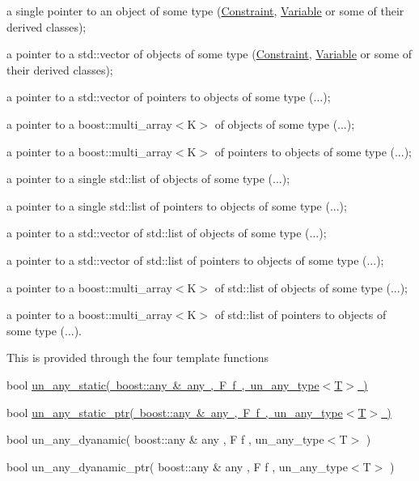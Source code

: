 \begin{DoxyItemize}
\item a single pointer to an object of some type (\mbox{\hyperlink{class_s_m_spp__di__unipi__it_1_1_constraint}{Constraint}}, \mbox{\hyperlink{class_s_m_spp__di__unipi__it_1_1_variable}{Variable}} or some of their derived classes);
\item a pointer to a std\+::vector of objects of some type (\mbox{\hyperlink{class_s_m_spp__di__unipi__it_1_1_constraint}{Constraint}}, \mbox{\hyperlink{class_s_m_spp__di__unipi__it_1_1_variable}{Variable}} or some of their derived classes);
\item a pointer to a std\+::vector of pointers to objects of some type (...);
\item a pointer to a boost\+::multi\+\_\+array$<$\+K$>$ of objects of some type (...);
\item a pointer to a boost\+::multi\+\_\+array$<$\+K$>$ of pointers to objects of some type (...);
\item a pointer to a single std\+::list of objects of some type (...);
\item a pointer to a single std\+::list of pointers to objects of some type (...);
\item a pointer to a std\+::vector of std\+::list of objects of some type (...);
\item a pointer to a std\+::vector of std\+::list of pointers to objects of some type (...);
\item a pointer to a boost\+::multi\+\_\+array$<$\+K$>$ of std\+::list of objects of some type (...);
\item a pointer to a boost\+::multi\+\_\+array$<$\+K$>$ of std\+::list of pointers to objects of some type (...).
\end{DoxyItemize}

This is provided through the four template functions

bool \mbox{\hyperlink{group__boost__any__stuff_ga8ec1a694aa7a5fa58ab801c1ea419fa8}{un\+\_\+any\+\_\+static( boost\+::any \& any , F f , un\+\_\+any\+\_\+type$<$\+T$>$ )}}

bool \mbox{\hyperlink{group__boost__any__stuff_ga52fc4cc92fd415dd9ba1ae8b68f44931}{un\+\_\+any\+\_\+static\+\_\+ptr( boost\+::any \& any , F f , un\+\_\+any\+\_\+type$<$\+T$>$ )}}

bool un\+\_\+any\+\_\+dyanamic( boost\+::any \& any , F f , un\+\_\+any\+\_\+type$<$\+T$>$ )

bool un\+\_\+any\+\_\+dyanamic\+\_\+ptr( boost\+::any \& any , F f , un\+\_\+any\+\_\+type$<$\+T$>$ )

